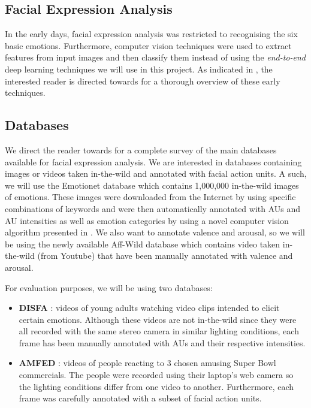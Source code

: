 \documentclass[12pt,twoside]{article}
\begin{document}
\subsection{Facial Expression Analysis}

In the early days, facial expression analysis was restricted to recognising the six basic emotions. Furthermore, computer vision techniques were used to extract features from input images and then classify them instead of using the \textit{end-to-end} deep learning techniques we will use in this project. As indicated in \cite{RefWorks:2}, the interested reader is directed towards \cite{RefWorks:18,RefWorks:19} for a thorough overview of these early techniques.

\subsection{Databases}

We direct the reader towards \cite{RefWorks:2} for a complete survey of the main databases available for facial expression analysis. We are interested in databases containing images or videos taken in-the-wild and annotated with facial action units. A such, we will use the Emotionet \cite{RefWorks:1} database which contains 1,000,000 in-the-wild images of emotions. These images were downloaded from the Internet by using specific combinations of keywords and were then automatically annotated with AUs and AU intensities as well as emotion categories by using a novel computer vision algorithm presented in \cite{RefWorks:1}. We also want to annotate valence and arousal, so we will be using the newly available Aff-Wild database \cite{RefWorks:2} which contains video taken in-the-wild (from Youtube) that have been manually annotated with valence and arousal.

For evaluation purposes, we will be using two databases:

\begin{itemize}
\item \textbf{DISFA} \cite{RefWorks:17}: videos of young adults watching video clips intended to elicit certain emotions. Although these videos are not in-the-wild since they were all recorded with the same stereo camera in similar lighting conditions, each frame has been manually annotated with AUs and their respective intensities.
\item \textbf{AMFED} \cite{RefWorks:18}: videos of people reacting to 3 chosen amusing Super Bowl commercials. The people were recorded using their laptop's web camera so the lighting conditions differ from one video to another. Furthermore, each frame was carefully annotated with a subset of facial action units.
\end{itemize}
\end{document}
